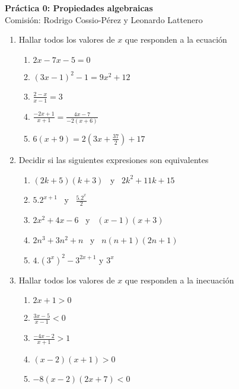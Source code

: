 \documentclass[a4paper]{article}
\newcommand{\exercise}{\item}
\begin{document}
\noindent \hrulefill 
\vspace{-7pt}
\begin{center} 
	\textbf{ Práctica 0: Propiedades algebraicas} \\
	Comisión: Rodrigo Cossio-Pérez y Leonardo Lattenero
\end{center}
\vspace{-10pt}
\hrulefill
\begin{enumerate}
	\exercise Hallar todos los valores de $x$ que responden a la ecuación
	\begin{enumerate} [label=(\alph*)]
		\item $2x-7x-5=0$
		\item $(3x-1)^2-1=9x^2+12$
		\item $\displaystyle\frac{2-x}{x-1}=3$
		\item $\displaystyle\frac{-2x+1}{x+1}=\displaystyle\frac{4x-7}{-2(x+6)}$
		\item $6(x+9)=2\left(3x+\displaystyle\frac{37}{2}\right)+17$
	\end{enumerate}
	\exercise Decidir si las siguientes expresiones son equivalentes
	\begin{enumerate} [label=(\alph*)]
		\item $(2k+5)(k+3)$ ~y~ $2k^2+11k+15$
		\item $5.2^{x+1}$ ~y~ $\displaystyle\frac{5.2^{x}}{2}$
		\item $2x^2+4x-6$ ~y~ $(x-1)(x+3)$
		\item $2n^3+3n^2+n$ ~y~ $n(n+1)(2n+1)$
		\item $4.\left(3^{x}\right)^{2}-3^{2x+1}$ y $3^x$
	\end{enumerate}
	\exercise Hallar todos los valores de $x$ que responden a la inecuación
	\begin{enumerate} [label=(\alph*)]
		\item $2x+1>0$
		\item $\displaystyle\frac{3x-5}{x-1}<0$
		\item $\displaystyle\frac{-4x-2}{x+1}>1$
		\item $(x-2)(x+1)>0$
		\item $-8(x-2)(2x+7)<0$
	\end{enumerate}

\end{enumerate}
\end{document}

